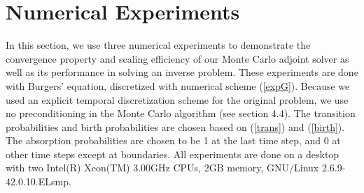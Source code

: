 \documentclass[a4paper,11pt]{article}
\theoremstyle{remark}
\theoremstyle{definition}
\begin{document}
    \vspace{3mm}\hspace{-12mm}
    \vspace{3mm}





\section{Numerical Experiments}
    In this section, we use three numerical experiments to demonstrate
    the convergence property and scaling efficiency of our Monte Carlo
    adjoint solver as well as its performance in solving an inverse
    problem.  These experiments are done with Burgers' equation,
    discretized with numerical scheme (\ref{expG}).  Because we used an
    explicit temporal discretization scheme for the original problem,
    we use no preconditioning in the Monte Carlo algorithm (see section 4.4).
    The transition probabilities and birth probabilities are chosen based
    on (\ref{trans}) and (\ref{birth}).  The absorption probabilities are
    chosen to be 1 at the last time step, and 0 at other time steps except
    at boundaries.  All experiments are done on a desktop with two Intel(R)
    Xeon(TM) 3.00GHz CPUs, 2GB memory, GNU/Linux 2.6.9-42.0.10.ELsmp.
    
\end{document}
